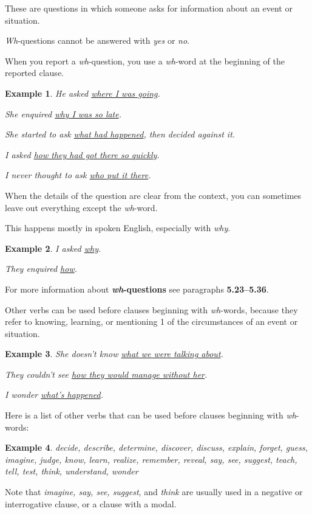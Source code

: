 \documentclass[oneside]{book}
\numberwithin{equation}{section}
\newtheorem{example}{Example}[section]
\begin{document}
These are questions in which someone asks for information about an event or situation.

\textit{Wh}-questions cannot be answered with \textit{yes} or \textit{no}.

%
When you report a \textit{wh}-question, you use a \textit{wh}-word at the beginning of the reported clause.
\begin{example}
    He asked \underline{where I was going}.
    
    She enquired \underline{why I was so late}.
    
    She started to ask \underline{what had happened}, then decided against it.
    
    I asked \underline{how they had got there so quickly}.
    
    I never thought to ask \underline{who put it there}.
\end{example}
When the details of the question are clear from the context, you can sometimes leave out everything except the \textit{wh}-word.

This happens mostly in spoken English, especially with \textit{why}.
\begin{example}
    I asked \underline{why}.
    
    They enquired \underline{how}.
\end{example}
For more information about \textbf{\textit{wh}-questions} see paragraphs \textbf{5.23--5.36}.

%
\noindent{} Other verbs can be used before clauses beginning with \textit{wh}-words, because they refer to knowing, learning, or mentioning 1 of the circumstances of an event or situation.
\begin{example}
    She doesn't know \underline{what we were talking about}.
    
    They couldn't see \underline{how they would manage without her}.
    
    I wonder \underline{what's happened}.
\end{example}
Here is a list of other verbs that can be used before clauses beginning with \textit{wh}-words:
\begin{example}
    decide, describe, determine, discover, discuss, explain, forget, guess, imagine, judge, know, learn, realize, remember, reveal, say, see, suggest, teach, tell, test, think, understand, wonder
\end{example}
Note that \textit{imagine, say, see, suggest}, and \textit{think} are usually used in a negative or interrogative clause, or a clause with a modal.
\end{document}
